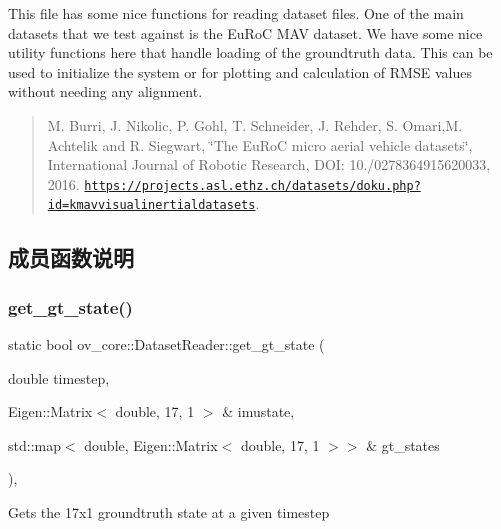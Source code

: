 This file has some nice functions for reading dataset files. One of the main datasets that we test against is the Eu\+RoC M\+AV dataset. We have some nice utility functions here that handle loading of the groundtruth data. This can be used to initialize the system or for plotting and calculation of R\+M\+SE values without needing any alignment.

\begin{quote}
M. Burri, J. Nikolic, P. Gohl, T. Schneider, J. Rehder, S. Omari,M. Achtelik and R. Siegwart, \char`\"{}\+The Eu\+Ro\+C micro aerial vehicle datasets\char`\"{}, International Journal of Robotic Research, D\+OI\+: 10./0278364915620033, 2016. \href{https://projects.asl.ethz.ch/datasets/doku.php?id=kmavvisualinertialdatasets}{\tt https\+://projects.\+asl.\+ethz.\+ch/datasets/doku.\+php?id=kmavvisualinertialdatasets}.\end{quote}


\subsection{成员函数说明}
\mbox{\label{classov__core_1_1DatasetReader_af7827150c03a1871d5211764699ef0eb}} 
\subsubsection{\texorpdfstring{get\+\_\+gt\+\_\+state()}{get\_gt\_state()}}
{\footnotesize\ttfamily static bool ov\+\_\+core\+::\+Dataset\+Reader\+::get\+\_\+gt\+\_\+state (\begin{DoxyParamCaption}\item[{double}]{timestep,  }\item[{Eigen\+::\+Matrix$<$ double, 17, 1 $>$ \&}]{imustate,  }\item[{std\+::map$<$ double, Eigen\+::\+Matrix$<$ double, 17, 1 $>$$>$ \&}]{gt\+\_\+states }\end{DoxyParamCaption})\hspace{0.3cm}{\ttfamily [inline]}, {\ttfamily [static]}}



Gets the 17x1 groundtruth state at a given timestep 


